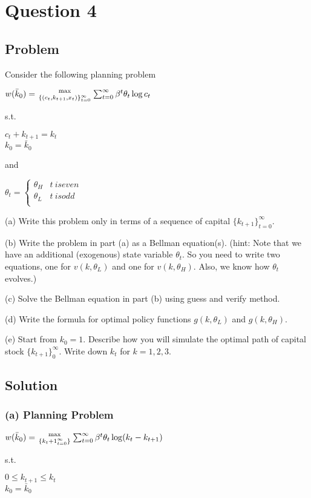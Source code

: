 \documentclass[10pt, a4paper]{article}
\begin{document}
\section*{Question 4}
  \subsection*{Problem}
    Consider the following planning problem
    \begin{center}
      $w(\bar k_0)={\max\atop{\{(c_t,k_{t+1},x_t)\}_{t=0}^{\infty}}}\sum^{\infty}_{t=0}\beta^t\theta_t\log c_t$
    \end{center}
    s.t.
    \begin{center}
      $c_t+k_{t+1} = k_t$ \\
      $k_0=\bar k_0$
    \end{center}
    and
    \begin{center}
      $\theta_t = \begin{cases} 
        \theta_H & t \ {is even} \\
        \theta_L & t \ {is odd} \\
      \end{cases}$
    \end{center}
    
    (a) Write this problem only in terms of a sequence of capital $\{k_{t+1}\}_{t=0}^{\infty}$.

    (b) Write the problem in part (a) as a Bellman equation(s). (hint: Note that we have an additional (exogenous) state variable $\theta_t$. So you need to write two equations, one for $v(k,\theta_L)$ and one for $v(k,\theta_H)$. Also, we know how $\theta_t$ evolves.)

    (c) Solve the Bellman equation in part (b) using guess and verify method.

    (d) Write the formula for optimal policy functions $g(k,\theta_L)$ and $g(k,\theta_H)$.

    (e) Start from $k_0=1$. Describe how you will simulate the optimal path of capital stock $\{k_{t+1}\}_0^{\infty}$. Write down $k_t$ for $k=1,2,3$. 
  \subsection*{Solution}
    \subsubsection*{(a) Planning Problem}
    \begin{center}
      $w(\bar{k}_0) = {\max\atop{\{k_t+1}^{\infty}_{t=0}\}} \sum_{t=0}^{\infty}\beta^t\theta_t\log(k_t-k_{t+1})$
    \end{center}
    s.t.
    \begin{center}
      $0\leq k_{t+1}\leq k_t$ \\
      $k_0=\bar{k}_0$
    \end{center}
\end{document}
